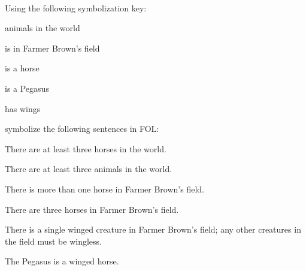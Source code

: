 \

\problempart Using the following symbolization key:
\begin{ekey}
\item[\text{论域}] animals in the world
\item[\atom{B}{x}]  is in Farmer Brown's field
\item[\atom{H}{x}]  is a horse
\item[\atom{P}{x}]  is a Pegasus
\item[\atom{W}{x}]  has wings
\end{ekey}
symbolize the following sentences in FOL:
\begin{compactlist}
\item There are at least three horses in the world.
\item[] 
\item There are at least three animals in the world.
\item[] 
\item There is more than one horse in Farmer Brown's field.
\item[] 
\item There are three horses in Farmer Brown's field.
\item[] 
\item There is a single winged creature in Farmer Brown's field; any other creatures in the field must be wingless.
\item[] 
\item The Pegasus is a winged horse.
\item[] 

\end{compactlist}
